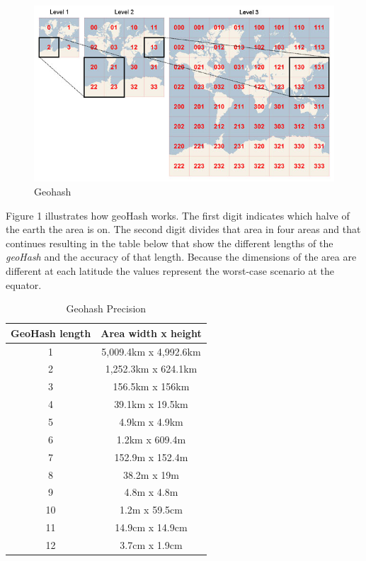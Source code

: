 \documentclass[
10pt, %
a4paper, %
oneside, %
headinclude,footinclude, %
BCOR5mm, %
]{scrartcl}
\begin{document}
\begin{figure}[htbp] %
   \centering
   \includegraphics[width=4.5in]{geohash.jpg} 
   \caption{Geohash}
   \label{fig:geohash}
\end{figure}
Figure 1 illustrates how geoHash works. The first digit indicates which halve of the earth the area is on. The second digit divides that area in four areas and that continues resulting in the table below that show the different lengths of the \textit{geoHash} and the accuracy of that length. Because the dimensions of the area are different at each latitude the values represent the worst-case scenario at the equator.


\begin{table}[h]
\caption[Geohash Precision]{Geohash Precision \cite{elasticsearch} }
\begin{tabular}{|c|c|}
\hline
GeoHash length & Area width x height   \\ \hline
1              & 5,009.4km x 4,992.6km \\ \hline
2              & 1,252.3km x 624.1km   \\ \hline
3              & 156.5km x 156km       \\ \hline
4              & 39.1km x 19.5km       \\ \hline
5              & 4.9km x 4.9km         \\ \hline
6              & 1.2km x 609.4m        \\ \hline
7              & 152.9m x 152.4m       \\ \hline
8              & 38.2m x 19m           \\ \hline
9              & 4.8m x 4.8m           \\ \hline
10             & 1.2m x 59.5cm         \\ \hline
11             & 14.9cm x 14.9cm       \\ \hline
12             & 3.7cm x 1.9cm         \\ \hline
\end{tabular}
\end{table}
\end{document}
